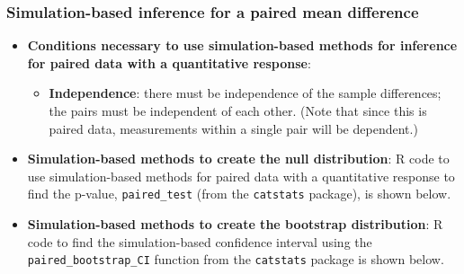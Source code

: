 \documentclass[
]{report}
\newenvironment{Shaded}{\begin{snugshade}}{\end{snugshade}}
\newcommand{\AttributeTok}[1]{\textcolor[rgb]{0.13,0.29,0.53}{#1}}
\newcommand{\CommentTok}[1]{\textcolor[rgb]{0.56,0.35,0.01}{\textit{#1}}}
\newcommand{\DecValTok}[1]{\textcolor[rgb]{0.00,0.00,0.81}{#1}}
\newcommand{\FunctionTok}[1]{\textcolor[rgb]{0.13,0.29,0.53}{\textbf{#1}}}
\newcommand{\NormalTok}[1]{#1}
\newcommand{\SpecialCharTok}[1]{\textcolor[rgb]{0.81,0.36,0.00}{\textbf{#1}}}
\newcommand{\StringTok}[1]{\textcolor[rgb]{0.31,0.60,0.02}{#1}}
\providecommand{\tightlist}{%
  \setlength{\itemsep}{0pt}\setlength{\parskip}{0pt}}
\begin{document}
\subsubsection*{Simulation-based inference for a paired mean difference}\label{simulation-based-inference-for-a-paired-mean-difference}

\begin{itemize}
\item
  \textbf{Conditions necessary to use simulation-based methods for inference for paired data with a quantitative response}:

  \begin{itemize}
  \tightlist
  \item
    \textbf{Independence}: there must be independence of the sample differences; the pairs must be independent of each other. (Note that since this is paired data, measurements within a single pair will be dependent.)
  \end{itemize}
\item
  \textbf{Simulation-based methods to create the null distribution}: R code to use simulation-based methods for paired data with a quantitative response to find the p-value, \texttt{paired\_test} (from the \texttt{catstats} package), is shown below.

\begin{Shaded}
\end{Shaded}
\item
  \textbf{Simulation-based methods to create the bootstrap distribution}: R code to find the simulation-based confidence interval using the \texttt{paired\_bootstrap\_CI} function from the \texttt{catstats} package is shown below.


\end{itemize}
\end{document}
